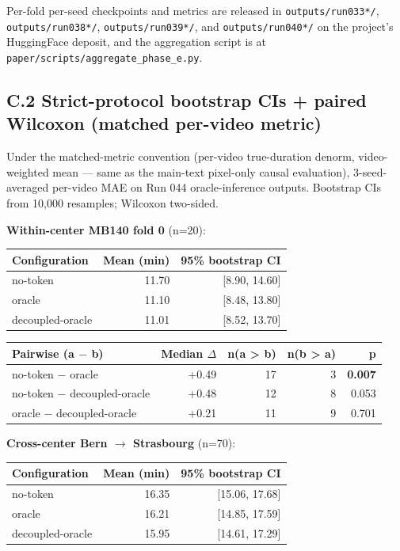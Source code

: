 Per-fold per-seed checkpoints and metrics are released in
\texttt{outputs/run033*/}, \texttt{outputs/run038*/},
\texttt{outputs/run039*/}, and \texttt{outputs/run040*/} on the
project's HuggingFace deposit, and the aggregation script is at
\texttt{paper/scripts/aggregate\_phase\_e.py}.

\subsection{C.2 Strict-protocol bootstrap CIs + paired Wilcoxon
(matched per-video
metric)}\label{c.2-strict-protocol-bootstrap-cis-paired-wilcoxon-matched-per-video-metric}

Under the matched-metric convention (per-video true-duration denorm,
video-weighted mean --- same as the main-text pixel-only causal evaluation), 3-seed-averaged per-video MAE on
Run 044 oracle-inference outputs. Bootstrap CIs from 10,000 resamples;
Wilcoxon two-sided.

\textbf{Within-center MB140 fold 0} (n=20):

\begin{longtable}[]{@{}lrr@{}}
\toprule\noalign{}
Configuration & Mean (min) & 95\% bootstrap CI \\
\midrule\noalign{}
\endhead
\bottomrule\noalign{}
\endlastfoot
no-token & 11.70 & {[}8.90, 14.60{]} \\
oracle & 11.10 & {[}8.48, 13.80{]} \\
decoupled-oracle & 11.01 & {[}8.52, 13.70{]} \\
\end{longtable}

\begin{longtable}[]{@{}lrrrr@{}}
\toprule\noalign{}
Pairwise (a $-$ b) & Median $\Delta$ & n(a \textgreater{} b) & n(b \textgreater{}
a) & p \\
\midrule\noalign{}
\endhead
\bottomrule\noalign{}
\endlastfoot
no-token $-$ oracle & +0.49 & 17 & 3 & \textbf{0.007} \\
no-token $-$ decoupled-oracle & +0.48 & 12 & 8 & 0.053 \\
oracle $-$ decoupled-oracle & +0.21 & 11 & 9 & 0.701 \\
\end{longtable}

\textbf{Cross-center Bern $\rightarrow$ Strasbourg} (n=70):

\begin{longtable}[]{@{}lrr@{}}
\toprule\noalign{}
Configuration & Mean (min) & 95\% bootstrap CI \\
\midrule\noalign{}
\endhead
\bottomrule\noalign{}
\endlastfoot
no-token & 16.35 & {[}15.06, 17.68{]} \\
oracle & 16.21 & {[}14.85, 17.59{]} \\
decoupled-oracle & 15.95 & {[}14.61, 17.29{]} \\
\end{longtable}

